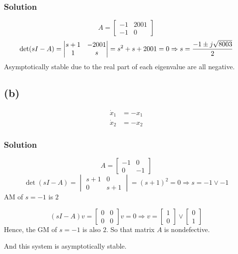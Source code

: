 \documentclass[12pt,a4paper]{article}
\begin{document}
	\subsubsection*{Solution}
	
	\[
	A = \begin{bmatrix}
		-1 & 2001 \\ -1 & 0
	\end{bmatrix}
	\]
	\[
	\det(sI - A) = \begin{vmatrix}
		s + 1 & -2001 \\ 1 & s
	\end{vmatrix} = s^2 + s + 2001 = 0 \Rightarrow s = {-1 \pm j\sqrt{8003} \over 2}
	\]
	Asymptotically stable due to the real part of each eigenvalue are all negative.
	
	\subsection*{(b)}
	\begin{align*}
		\dot{x}_{1} &= -x_{1} \\
		\dot{x}_{2} &= -x_{2}
	\end{align*}
	\subsubsection*{Solution}
	\[
	A = \begin{bmatrix}
		-1 & 0 \\0 & -1 
	\end{bmatrix}	
	\]
	\[
	\det (sI - A) = \begin{vmatrix}
		s + 1 & 0 \\ 0 & s+ 1
	\end{vmatrix} = (s + 1)^2 = 0 \Rightarrow s = -1 \lor -1
	\]
	AM of $s = -1$ is $2$
	
	\[
	(sI - A) v= \begin{bmatrix}
		0 & 0 \\ 0 & 0
	\end{bmatrix}v = 0 \Rightarrow v = \begin{bmatrix}
	1 \\ 0
	\end{bmatrix} \lor \begin{bmatrix}
	0 \\ 1
	\end{bmatrix}
	\]
	Hence, the GM of $s = -1$ is also $2$. So that matrix $A$ is nondefective.
	
	And this system is asymptotically stable.
	
\end{document}
